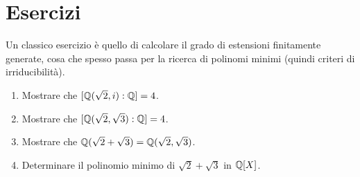 \section{Esercizi}

Un classico esercizio è quello di calcolare il grado di estensioni finitamente generate, cosa che spesso passa per la ricerca di polinomi minimi (quindi criteri di irriducibilità).

\begin{eser}
\begin{enumerate}
\item Mostrare che $[\mathbb{Q}(\sqrt{2},i):\mathbb{Q}]=4$.
\item Mostrare che $[\mathbb{Q}(\sqrt{2},\sqrt{3}):\mathbb{Q}]=4$.
\item Mostrare che $\mathbb{Q}(\sqrt{2}+\sqrt{3})=\mathbb{Q}(\sqrt{2},\sqrt{3})$.
\item Determinare il polinomio minimo di $\sqrt{2}+\sqrt{3}$ in $\mathbb{Q}[X]$.
\end{enumerate}
\end{eser}

